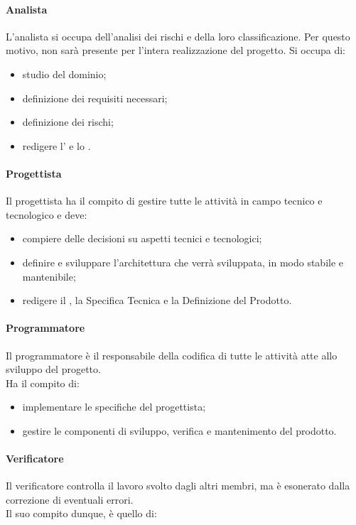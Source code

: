 		\paragraph{Analista}
		L'analista si occupa dell'analisi dei rischi e della loro classificazione. Per questo motivo, non sarà presente per l'intera realizzazione del progetto.
		Si occupa di:
		\begin{itemize}
			\item studio del dominio;
			\item definizione dei requisiti necessari;
			\item definizione dei rischi;
			\item redigere l' e lo .
		\end{itemize}
		
		\paragraph{Progettista}
		Il progettista ha il compito di gestire tutte le attività in campo tecnico e tecnologico e deve:
		\begin{itemize}
			\item compiere delle decisioni su aspetti tecnici e tecnologici;
			\item definire e sviluppare l'architettura che verrà sviluppata, in modo stabile e mantenibile;
			\item redigere il , la Specifica Tecnica e la Definizione del Prodotto.	
		\end{itemize}

		\paragraph{Programmatore}
		Il programmatore è il responsabile della codifica di tutte le attività atte allo sviluppo del progetto. \\
		Ha il compito di:
		\begin{itemize}
			\item implementare le specifiche del progettista;
			\item gestire le componenti di sviluppo, verifica e mantenimento del prodotto.
		\end{itemize}
			
		\paragraph{Verificatore}
		Il verificatore controlla il lavoro svolto dagli altri membri, ma è esonerato dalla correzione di eventuali errori. \\
		Il suo compito dunque, è quello di:
		
